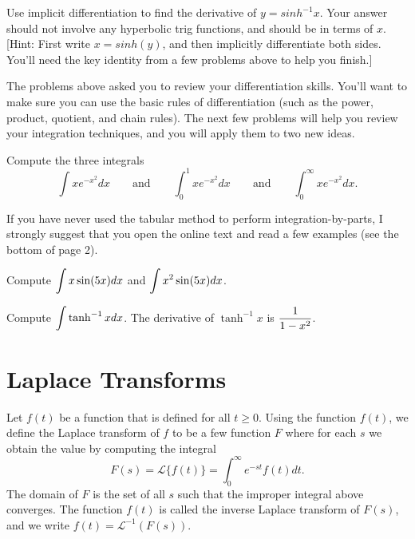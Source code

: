 \begin{problem}
 Use implicit differentiation to find the derivative of $y=sinh^{-1}x$. Your answer should not involve any hyperbolic trig functions, and should be in terms of $x$. [Hint: First write $x=sinh(y)$, and then implicitly differentiate both sides.  You'll need the key identity from a few problems above to help you finish.]
\end{problem}

The problems above asked you to review your differentiation skills.  You'll want to make sure you can use the basic rules of differentiation (such as the power, product, quotient, and chain rules). The next few problems will help you review your integration techniques, and you will apply them to two new ideas.

\begin{problem}
Compute the three integrals 
$$\int x e^{-x^2}dx
\quad\quad\text{and}\quad\quad 
\int_0^1 x e^{-x^2}dx
\quad\quad\text{and}\quad\quad 
\int_0^\infty x e^{-x^2}dx.$$
\end{problem}
If you have never used the tabular method to perform integration-by-parts, I strongly suggest that you open the online text and read a few examples (see the bottom of page 2). 


\begin{problem}
Compute $\displaystyle \int x\sin (5x) dx$ and $\displaystyle \int x^2\sin (5x) dx$.
\end{problem}

\begin{problem}
Compute $\displaystyle \int \tanh^{-1}x dx$. The derivative of $\tanh^{-1}x$ is $\displaystyle\frac{1}{1-x^2}$.
\end{problem}


\section{Laplace Transforms}
\begin{definition}
Let $f(t)$ be a function that is defined for all $t\geq 0$.  Using the function $f(t)$, we define the Laplace transform of $f$ to be a few function $F$ where for each $s$ we obtain the value by computing the integral
$$F(s) = \mathscr{L}\{f(t)\}=\int_0^\infty e^{-st}f(t)dt.$$
The domain of $F$ is the set of all $s$ such that the improper integral above converges.
The function $f(t)$ is called the inverse Laplace transform of $F(s)$, and we write $f(t)=\mathscr{L}^{-1}(F(s))$.
\end{definition}

